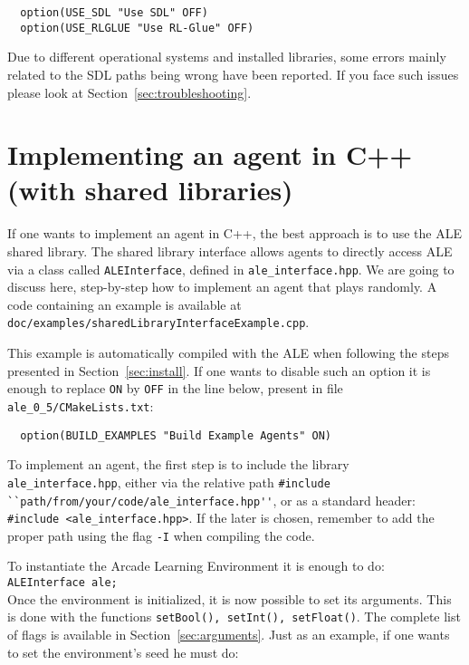 \documentclass[12pt]{article}
\begin{document}
\begin{verbatim}
  option(USE_SDL "Use SDL" OFF)
  option(USE_RLGLUE "Use RL-Glue" OFF)
\end{verbatim}

Due to different operational systems and installed libraries, some errors mainly related to the SDL 
paths being wrong have been reported. If you face such issues please look at 
Section~\ref{sec:troubleshooting}.

\section{Implementing an agent in C++ (with shared libraries)}

If one wants to implement an agent in C++, the best approach is to use the ALE shared library. 
The shared library interface allows agents to directly access ALE via a class called
\verb+ALEInterface+, defined in \verb+ale_interface.hpp+. We are going to discuss here, 
step-by-step how to implement an agent that plays randomly. A code containing an example is
available at \verb+doc/examples/sharedLibraryInterfaceExample.cpp+.

This example is automatically compiled with the ALE when following the steps presented in
Section~\ref{sec:install}. If one wants to disable such an option it is enough to replace \verb+ON+ 
by \verb+OFF+ in the line below, present in file \verb+ale_0_5/CMakeLists.txt+:

\begin{verbatim}
  option(BUILD_EXAMPLES "Build Example Agents" ON)
\end{verbatim}

To implement an agent, the first step is to include the library \verb+ale_interface.hpp+, either via 
the relative path \verb+#include ``path/from/your/code/ale_interface.hpp''+, or as a standard 
header: \verb+#include <ale_interface.hpp>+. If the later is chosen, remember to add the proper 
path using the flag \verb+-I+ when compiling the code.

To instantiate the Arcade Learning Environment it is enough to do:\\

\verb+ALEInterface ale;+\\

Once the environment is initialized, it is now possible to set its arguments. This is done with the 
functions \verb+setBool(), setInt(), setFloat()+. The complete list of flags is available in 
Section~\ref{sec:arguments}. Just as an example, if one wants to set the environment's seed he must 
do:\\
\end{document}
